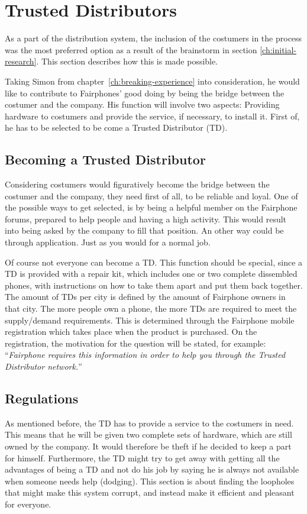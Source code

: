 \documentclass[final,a4paper]{report} %
\begin{document}
\chapter{Trusted Distributors} %
\label{ch:trusted-distributors}
As a part of the distribution system, the inclusion of the costumers in the process was the most preferred option as a result of the brainstorm in section \ref{ch:initial-research}. This section describes how this is made possible.

Taking Simon from chapter~\ref{ch:breaking-experience} into consideration, he would like to contribute to Fairphones' good doing by being the bridge between the costumer and the company. His function will involve two aspects: Providing hardware to costumers and provide the service, if necessary, to install it. First of, he has to be selected to be come a Trusted Distributor (TD).

\section{Becoming a Trusted Distributor}
Considering costumers would figuratively become the bridge between the costumer and the company, they need first of all, to be reliable and loyal. One of the possible ways to get selected, is by being a helpful member on the Fairphone forums, prepared to help people and having a high activity. This would result into being asked by the company to fill that position. An other way could be through application. Just as you would for a normal job. 

Of course not everyone can become a TD. This function should be special, since a TD is provided with a repair kit, which includes one or two complete dissembled phones, with instructions on how to take them apart and put them back together. The amount of TDs per city is defined by the amount of Fairphone owners in that city. The more people own a phone, the more TDs are required to meet the supply/demand requirements. This is determined through the Fairphone mobile registration which takes place when the product is purchased. On the registration, the motivation for the question will be stated, for example: ``\textit{Fairphone requires this information in order to help you through the Trusted Distributor network.}''  

\section{Regulations}\label{sec:regulations}
As mentioned before, the TD has to provide a service to the costumers in need. This means that he will be given two complete sets of hardware, which are still owned by the company. It would therefore be theft if he decided to keep a part for himself. Furthermore, the TD might try to get away with getting all the advantages of being a TD and not do his job by saying he is always not available when someone needs help (dodging). This section is about finding the loopholes that might make this system corrupt, and instead make it efficient and pleasant for everyone.
\end{document}
